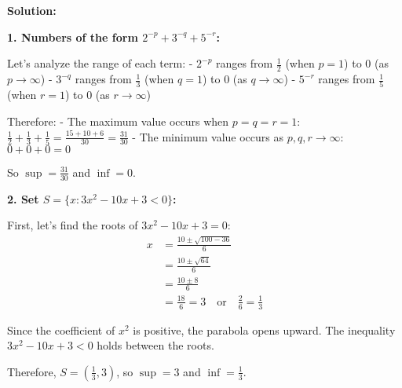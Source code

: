 \bigskip\noindent\textbf{Solution:}

\textbf{1. Numbers of the form $2^{-p} + 3^{-q} + 5^{-r}$:}

Let's analyze the range of each term:
- $2^{-p}$ ranges from $\frac{1}{2}$ (when $p = 1$) to $0$ (as $p \to \infty$)
- $3^{-q}$ ranges from $\frac{1}{3}$ (when $q = 1$) to $0$ (as $q \to \infty$)
- $5^{-r}$ ranges from $\frac{1}{5}$ (when $r = 1$) to $0$ (as $r \to \infty$)

Therefore:
- The maximum value occurs when $p = q = r = 1$: $\frac{1}{2} + \frac{1}{3} + \frac{1}{5} = \frac{15 + 10 + 6}{30} = \frac{31}{30}$
- The minimum value occurs as $p, q, r \to \infty$: $0 + 0 + 0 = 0$

So $\sup = \textbf{$\frac{31}{30}$}$ and $\inf = \textbf{$0$}$.

\textbf{2. Set $S = \{x : 3x^2 - 10x + 3 < 0\}$:}

First, let's find the roots of $3x^2 - 10x + 3 = 0$:
\begin{align*}
x &= \frac{10 \pm \sqrt{100 - 36}}{6} \\
&= \frac{10 \pm \sqrt{64}}{6} \\
&= \frac{10 \pm 8}{6} \\
&= \frac{18}{6} = 3 \quad \text{or} \quad \frac{2}{6} = \frac{1}{3}
\end{align*}

Since the coefficient of $x^2$ is positive, the parabola opens upward. The inequality $3x^2 - 10x + 3 < 0$ holds between the roots.

Therefore, $S = (\frac{1}{3}, 3)$, so $\sup = \textbf{$3$}$ and $\inf = \textbf{$\frac{1}{3}$}$.

